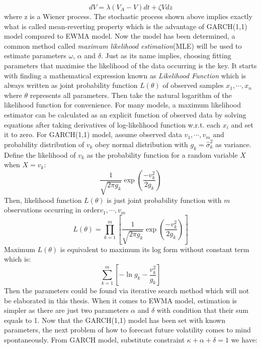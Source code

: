 \begin{equation}
dV=\lambda(V_A-V)dt+\zeta Vdz
\end{equation} 
where z is a Wiener process. The stochastic process shown above implies exactly what is called mean-reverting property which is the advantage of GARCH(1,1) model compared to EWMA model. Now the model has been determined, a common method called \textit{maximum likelihood estimation}(MLE) will be used to estimate parameters $\omega$, $\alpha$ and $\delta$. Just as its name implies, choosing fitting parameters that maximise the likelihood of the data occurring is the key. It starts with finding a mathematical expression known as \textit{Likelihood Function} which is always written as joint probability function $L(\theta)$ of observed samples $x_1,\cdots,x_n$ where $\theta$ represents all parameters. Then take the natural logarithm of the likelihood function for convenience. For many models, a maximum likelihood estimator can be calculated as an explicit function of observed data by solving equations after taking derivatives of log-likelihood function w.r.t. each $x_i$ and set it to zero. For GARCH(1,1) model, assume observed data $v_1,\cdots,v_m$ and  probability distribution of $v_k$ obey normal distribution with $g_k=\hat{\sigma}_k^2$ as variance. Define the likelihood of $v_k$ as the probability function for a random variable $X$ when $X=v_k$:
\begin{equation}
\frac{1}{\sqrt{2\pi g_k}}\exp({\frac{-v_k^2}{2g_k}}) \nonumber
\end{equation} 
Then, likelihood function $L(\theta)$ is just joint probability function with $m$ observations occurring in order$v_1,\cdots,v_m$ 
\begin{equation}
L(\theta)=\prod\limits_{k=1}^{m}[\frac{1}{\sqrt{2\pi g_k}}\exp({\frac{-v_k^2}{2g_k}})] 
\end{equation} 
Maximum $L(\theta)$ is equivalent to maximum its log form without constant term which is:
\begin{equation}
\sum_{k=1}^{m}[-\ln{g_k}-\frac{v_k^2}{g_k}] 
\end{equation} 
Then the parameters could be found via iterative search method which will not be elaborated in this thesis. When it comes to EWMA model, estimation is simpler as there are just two parameters $\alpha$ and $\delta$ with condition that their sum equals to 1. 
Now that the GARCH(1,1) model has been set with known parameters, the next problem of how to forecast future volatility comes to mind spontaneously. From GARCH model, substitute constraint  $\kappa+\alpha+\delta=1$ we have:
